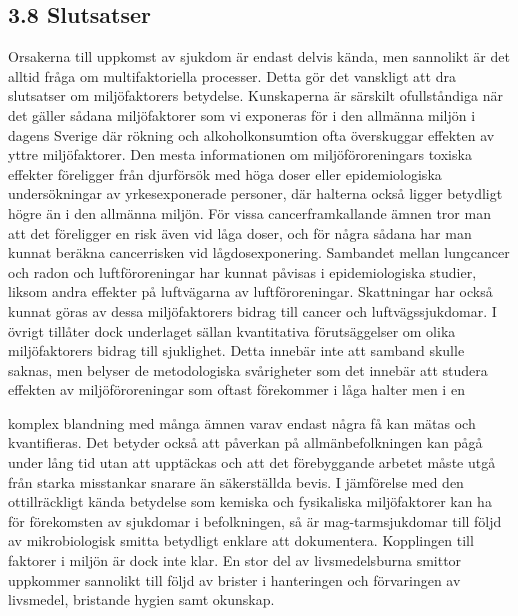 \subsection*{3.8 Slutsatser}
Orsakerna till uppkomst av sjukdom är endast delvis kända, men sannolikt är det alltid fråga om multifaktoriella processer. Detta gör det vanskligt att dra slutsatser om miljöfaktorers betydelse. Kunskaperna är särskilt ofullståndiga när det gäller sådana miljöfaktorer som vi exponeras för i den allmänna miljön i dagens Sverige där rökning och alkoholkonsumtion ofta överskuggar effekten av yttre miljöfaktorer. Den mesta informationen om miljöföroreningars toxiska effekter föreligger från djurförsök med höga doser eller epidemiologiska undersökningar av yrkesexponerade personer, där halterna också ligger betydligt högre än i den allmänna miljön. För vissa cancerframkallande ämnen tror man att det föreligger en risk även vid låga doser, och för några sådana har man kunnat beräkna cancerrisken vid lågdosexponering. Sambandet mellan lungcancer och radon och luftföroreningar har kunnat påvisas i epidemiologiska studier, liksom andra effekter på luftvägarna av luftföroreningar. Skattningar har också kunnat göras av dessa miljöfaktorers bidrag till cancer och luftvägssjukdomar. I övrigt tillåter dock underlaget sällan kvantitativa förutsäggelser om olika miljöfaktorers bidrag till sjuklighet. Detta innebär inte att samband skulle saknas, men belyser de metodologiska svårigheter som det innebär att studera effekten av miljöföroreningar som oftast förekommer i låga halter men i en

komplex blandning med många ämnen varav endast några få kan mätas och kvantifieras. Det betyder också att påverkan på allmänbefolkningen kan pågå under lång tid utan att upptäckas och att det förebyggande arbetet måste utgå från starka misstankar snarare än säkerställda bevis.
I jämförelse med den ottillräckligt kända betydelse som kemiska och fysikaliska miljöfaktorer kan ha för förekomsten av sjukdomar i befolkningen, så är mag-tarmsjukdomar till följd av mikrobiologisk smitta betydligt enklare att dokumentera. Kopplingen till faktorer i miljön är dock inte klar. En stor del av livsmedelsburna smittor uppkommer sannolikt till följd av brister i hanteringen och förvaringen av livsmedel, bristande hygien samt okunskap.
